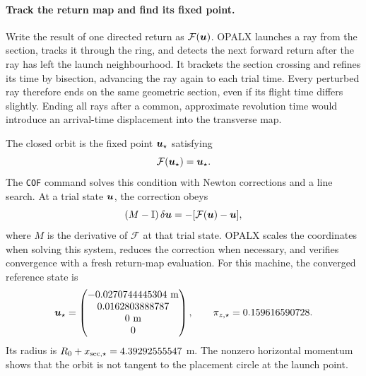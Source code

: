 \paragraph{Track the return map and find its fixed point.}
Write the result of one directed return as $\mathcal F(\boldsymbol{u})$.
OPALX launches a ray from the section, tracks it through the ring, and detects
the next forward return after the ray has left the launch neighbourhood.
It brackets the section crossing and refines its time by bisection, advancing
the ray again to each trial time. Every perturbed ray therefore ends on the
same geometric section, even if its flight time differs slightly. Ending
all rays after a common, approximate revolution time would introduce an
arrival-time displacement into the transverse map.

The closed orbit is the fixed point $\boldsymbol{u}_\star$ satisfying
\begin{equation}
 \mathcal F(\boldsymbol{u}_\star)=\boldsymbol{u}_\star.
 \label{eq:cof-fixed-point}
\end{equation}
The \texttt{COF} command solves this condition with Newton corrections and a
line search. At a trial state $\boldsymbol{u}$, the correction obeys
\begin{equation}
 (M-\mathbb I)\,\delta\boldsymbol{u}
       =-[\mathcal F(\boldsymbol{u})-\boldsymbol{u}],
 \label{eq:cof-newton}
\end{equation}
where $M$ is the derivative of $\mathcal F$ at that trial state. OPALX scales
the coordinates when solving this system, reduces the correction when
necessary, and verifies convergence with a fresh return-map evaluation.
For this machine, the converged reference state is
\begin{equation}
 \boldsymbol{u}_\star=\begin{pmatrix}
 -0.0270744445304\ \mathrm m\\
  0.0162803888787\\0\ \mathrm m\\0
 \end{pmatrix},\qquad
 \pi_{z,\star}=0.159616590728.
 \label{eq:cof-reference-state}
\end{equation}
Its radius is $R_0+x_{\rm sec,\star}=4.39292555547$ m. The nonzero horizontal
momentum shows that the orbit is not tangent to the placement circle at the
launch point.

